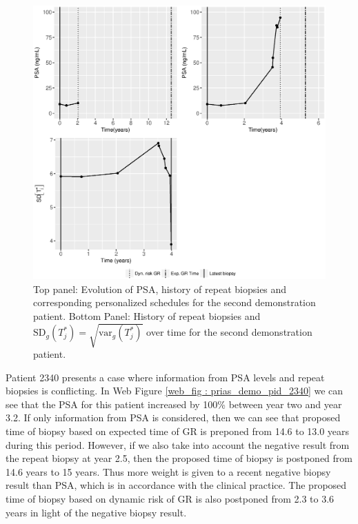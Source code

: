 \begin{figure}
\centerline{\includegraphics[width=\columnwidth]{images/prias_demo/case_3174.eps}}
\caption{Top panel: Evolution of PSA, history of repeat biopsies and corresponding personalized schedules for the second demonstration patient. Bottom Panel: History of repeat biopsies and $\mbox{SD}_g(T^*_j) = \sqrt{\mbox{var}_g(T^*_j)}$ over time for the second demonstration patient.}
\label{fig : prias_demo_pid_3174}
\end{figure}

\clearpage

Patient 2340 presents a case where information from PSA levels and repeat biopsies is conflicting. In Web Figure \ref{web_fig : prias_demo_pid_2340} we can see that the PSA for this patient increased by 100\% between year two and year 3.2. If only information from PSA is considered, then we can see that proposed time of biopsy based on expected time of GR is preponed from 14.6 to 13.0 years during this period. However, if we also take into account the negative result from the repeat biopsy at year 2.5, then the proposed time of biopsy is postponed from 14.6 years to 15 years. Thus more weight is given to a recent negative biopsy result than PSA, which is in accordance with the clinical practice. The proposed time of biopsy based on dynamic risk of GR is also postponed from 2.3 to 3.6 years in light of the negative biopsy result.

